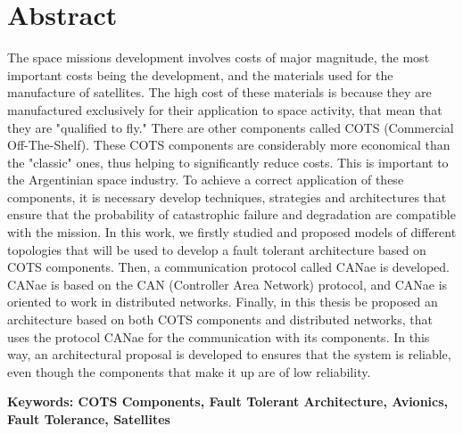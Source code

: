 \chapter*{Abstract}
\label{chap:abstract}
The space missions development involves costs of major magnitude, the most important costs
being the development, and the materials used for the manufacture of satellites. The high
cost of these materials is because they are manufactured exclusively for their application
to space activity, that mean that they are "qualified to fly." There are other components
called COTS (Commercial Off-The-Shelf). These COTS components are considerably more
economical than the "classic" ones, thus helping to significantly reduce costs. This is
important to the Argentinian space industry. To achieve a correct application of these
components, it is necessary develop  techniques, strategies and architectures that ensure
that the probability of catastrophic failure and degradation are compatible with the mission.
In this work, we firstly studied and proposed models of different topologies that will
be used to develop a fault tolerant architecture based on COTS components. Then, a communication
protocol called CANae is developed. CANae is  based on the CAN (Controller Area Network)
protocol, and CANae is oriented to work in distributed networks. Finally, in this thesis
be proposed an architecture based on both COTS components and distributed networks, that
uses the protocol CANae for the communication with its components. In this way, an
architectural proposal is developed to ensures that the system is reliable, even though
the components that make it up are of low reliability.


\textbf{Keywords: COTS Components, Fault Tolerant Architecture, Avionics, Fault Tolerance, Satellites}
